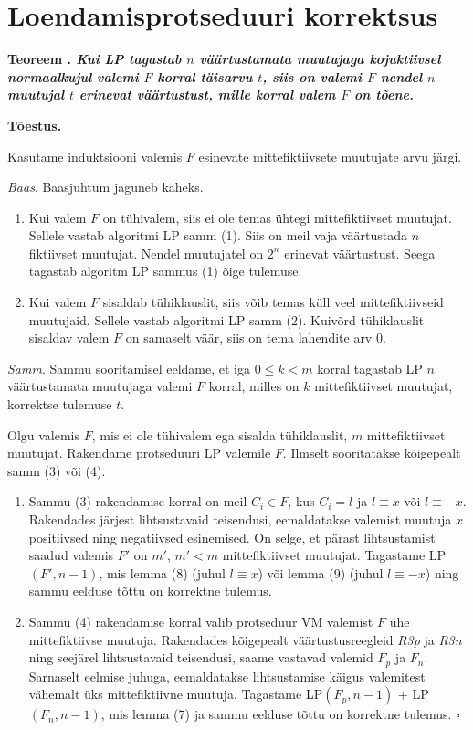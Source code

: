 \documentclass[12pt,estonian]{report}
\newcounter{lemma_counter}\setcounter{lemma_counter}{1}
\newcounter{theorem_counter}\setcounter{theorem_counter}{1}
\newcommand{\theorem}[1]{
	\hspace{1cm}\textbf{Teoreem \arabic{theorem_counter}\stepcounter{theorem_counter}. \textit{#1}}
}
\newcommand{\proof}[0]{
	\hspace{1cm}\textbf{Tõestus.}
}
\newcommand{\proofend}[0]{\(\square\)}
\newcommand{\proc}[1]{\textsf{#1}}
\begin{document}
\section{Loendamisprotseduuri korrektsus}

\theorem{Kui \proc{LP} tagastab $n$ väärtustamata muutujaga kojuktiivsel normaalkujul valemi $F$ korral täisarvu $t$,
siis on valemi $F$ nendel $n$ muutujal $t$ erinevat väärtustust, mille korral valem $F$ on tõene.}

\proof
Kasutame induktsiooni valemis $F$ esinevate mittefiktiivsete muutujate arvu järgi.

\emph{Baas}. Baasjuhtum jaguneb kaheks.
\begin{enumerate}
\item Kui valem $F$ on tühivalem, siis ei ole temas ühtegi mittefiktiivset muutujat.
Sellele vastab algoritmi \proc{LP} samm (1). Siis on meil vaja väärtustada $n$
fiktiivset muutujat. Nendel muutujatel on $2^n$ erinevat väärtustust. Seega
tagastab algoritm \proc{LP} sammus (1) õige tulemuse.
\item Kui valem $F$ sisaldab tühiklauslit, siis võib temas küll veel mittefiktiivseid
muutujaid. Sellele vastab algoritmi \proc{LP} samm (2). Kuivõrd tühiklauslit 
sisaldav valem $F$ on samaselt väär, siis on tema lahendite arv 0.
\end{enumerate}

\emph{Samm}. Sammu sooritamisel eeldame, et iga $0\le k<m$ korral tagastab \proc{LP}
$n$ väärtustamata muutujaga valemi $F$ korral, milles on $k$ mittefiktiivset muutujat, korrektse tulemuse
$t$.

Olgu valemis $F$, mis ei ole tühivalem ega sisalda tühiklauslit, $m$ mittefiktiivset muutujat. Rakendame protseduuri \proc{LP}
valemile $F$. Ilmselt sooritatakse kõigepealt samm (3) või (4).

\begin{enumerate}
\item Sammu (3) rakendamise korral on meil $C_i\in F$, kus $C_i=l$ ja $l\equiv x$ või $l\equiv -x$.
Rakendades järjest lihtsustavaid teisendusi, eemaldatakse valemist muutuja $x$ positiivsed ning
negatiivsed esinemised. On selge, et pärast lihtsustamist saadud valemis $F'$ on $m'$, $m'<m$ mittefiktiivset
muutujat. Tagastame \mbox{\proc{LP}$(F',n-1)$}, mis lemma (8) (juhul $l\equiv x$) või
lemma (9) (juhul $l\equiv -x$) ning sammu eelduse tõttu on korrektne tulemus.
\item Sammu (4) rakendamise korral valib protseduur \proc{VM} valemist $F$ ühe
mittefiktiivse muutuja. Rakendades kõigepealt väärtustusreegleid \emph{R3p} ja \emph{R3n}
ning seejärel lihtsustavaid teisendusi, saame vastavad valemid $F_p$ ja $F_n$. Sarnaselt
eelmise juhuga, eemaldatakse lihtsustamise käigus valemitest vähemalt
üks mittefiktiivne muutuja. Tagastame
\mbox{\proc{LP}$(F_p, n-1)$} $+$ \mbox{\proc{LP}$(F_n, n-1)$}, mis lemma (7) ja sammu
eelduse tõttu on korrektne tulemus. \proofend
\end{enumerate}
\end{document}
